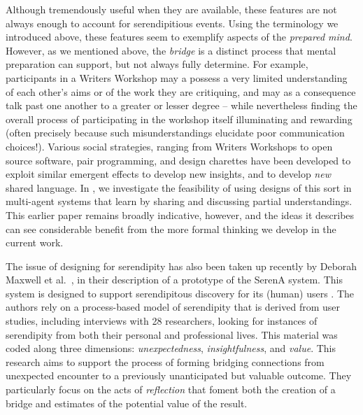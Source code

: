 Although tremendously useful when they are available, these features
are not always enough to account for serendipitious events.  Using the
terminology we introduced above, these features seem to exemplify
aspects of the \emph{prepared mind}.  However, as we mentioned above,
the \emph{bridge} is a distinct process that mental preparation can
support, but not always fully determine.  For example, participants in
a Writers Workshop may a possess a very limited understanding of each
other's aims or of the work they are critiquing, and may as a
consequence talk past one another to a greater or lesser degree --
while nevertheless finding the overall process of participating in the
workshop itself illuminating and rewarding (often precisely because
such misunderstandings elucidate poor communication choices!).
Various social strategies, ranging from Writers Workshops to open
source software, pair programming, and design charettes
\cite[p. 11]{gabriel2002writer} have been developed to exploit similar
emergent effects to develop new insights, and to develop \emph{new}
shared language.  In \cite{poetry-workshop}, we investigate the
feasibility of using designs of this sort in multi-agent systems that
learn by sharing and discussing partial understandings.  This earlier
paper remains broadly indicative, however, and the ideas it describes
can see considerable benefit from the more formal thinking we develop
in the current work.

The issue of designing for serendipity has also been taken up recently
by Deborah Maxwell et al.~\citeyear{maxwell2012designing}, in their
description of a prototype of the {\sf SerenA} system.  This system is
designed to support serendipitous discovery for its (human) users
\cite{forth2013serena}.  The authors rely on a process-based model of
serendipity \cite{Makri2012,Makri2012a} that is derived from user
studies, including interviews with 28 researchers, looking for
instances of serendipity from both their personal and professional
lives.  This material was coded along three dimensions:
\emph{unexpectedness}, \emph{insightfulness}, and \emph{value}.  This
research aims to support the process of forming bridging connections
from unexpected encounter to a previously unanticipated but valuable
outcome.  They particularly focus on the acts of \emph{reflection}
that foment both the creation of a bridge and estimates of the
potential value of the result.

